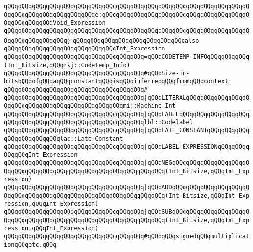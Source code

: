 \verb|qQQqqQQqqQQqqQQqqQQqqQQqqQQqqQQqqQQqqQQqqQQqqQQqqQQqqQQqqQQqqQQqqQQqqQQqqQQqqQQqqQQqqQQqqQQqqQQqe:qQQqqQQqqQQqqQQqqQQqqQQqqQQqqQQqqQQqqQQqqQQqqQQqqQQqqQQqVoid_Expression|\newline
\verb|qQQqqQQqqQQqqQQqqQQqqQQqqQQqqQQqqQQqqQQqqQQqqQQqqQQqqQQqqQQqqQQqqQQqqQQqqQQqqQQqqQQqqQQq}|\newline
\newline
\verb|qQQqqQQqqQQqqQQqqQQqqQQqqQQqqQQqalso|\newline
\verb|qQQqqQQqqQQqqQQqqQQqqQQqqQQqqQQqInt_Expression|\newline
\verb|qQQqqQQqqQQqqQQqqQQqqQQqqQQqqQQqqQQqqQQq=qQQqCODETEMP_INFOqQQqqQQqqQQq(Int_Bitsize,qQQqrkj::Codetemp_Info)|\newline
\newline
\verb|qQQqqQQqqQQqqQQqqQQqqQQqqQQqqQQqqQQqqQQq#qQQqSize-in-bitsqQQqofqQQqaqQQqconstantqQQqisqQQqinferredqQQqfromqQQqcontext:|\newline
\verb|qQQqqQQqqQQqqQQqqQQqqQQqqQQqqQQqqQQqqQQq#|\newline
\verb|qQQqqQQqqQQqqQQqqQQqqQQqqQQqqQQqqQQqqQQq|\verb#|qQQqLITERALqQQqqQQqqQQqqQQqqQQqqQQqqQQqqQQqqQQqqQQqqQQqqQQqqQQqmi::Machine_Int#\newline
\verb|qQQqqQQqqQQqqQQqqQQqqQQqqQQqqQQqqQQqqQQq|\verb#|qQQqLABELqQQqqQQqqQQqqQQqqQQqqQQqqQQqqQQqqQQqqQQqqQQqqQQqqQQqqQQqqQQqlbl::Codelabel#\newline
\verb|qQQqqQQqqQQqqQQqqQQqqQQqqQQqqQQqqQQqqQQq|\verb#|qQQqLATE_CONSTANTqQQqqQQqqQQqqQQqqQQqqQQqqQQqlac::Late_Constant#\newline
\verb|qQQqqQQqqQQqqQQqqQQqqQQqqQQqqQQqqQQqqQQq|\verb#|qQQqLABEL_EXPRESSIONqQQqqQQqqQQqqQQqInt_Expression#\newline
\newline
\verb|qQQqqQQqqQQqqQQqqQQqqQQqqQQqqQQqqQQqqQQq|\verb#|qQQqNEGqQQqqQQqqQQqqQQqqQQqqQQqqQQqqQQqqQQqqQQqqQQqqQQqqQQqqQQqqQQqqQQqqQQq(Int_Bitsize,qQQqInt_Expression)#\newline
\verb|qQQqqQQqqQQqqQQqqQQqqQQqqQQqqQQqqQQqqQQq|\verb#|qQQqADDqQQqqQQqqQQqqQQqqQQqqQQqqQQqqQQqqQQqqQQqqQQqqQQqqQQqqQQqqQQqqQQqqQQq(Int_Bitsize,qQQqInt_Expression,qQQqInt_Expression)#\newline
\verb|qQQqqQQqqQQqqQQqqQQqqQQqqQQqqQQqqQQqqQQq|\verb#|qQQqSUBqQQqqQQqqQQqqQQqqQQqqQQqqQQqqQQqqQQqqQQqqQQqqQQqqQQqqQQqqQQqqQQqqQQq(Int_Bitsize,qQQqInt_Expression,qQQqInt_Expression)#\newline
\newline
\verb|qQQqqQQqqQQqqQQqqQQqqQQqqQQqqQQqqQQqqQQq#qQQqqQQqsignedqQQqmultiplicationqQQqetc.qQQq|\newline
